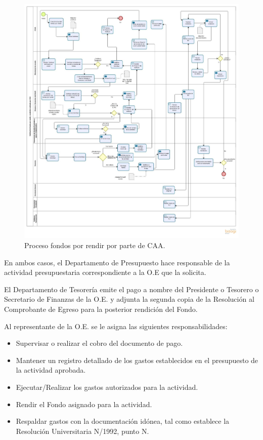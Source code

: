 \begin{figure}[h!]
	\includegraphics[width=\textwidth]{Imagenes/Solicitud_CCAA.jpg}
	\caption{\label{Solicitud_CAA}Proceso fondos por rendir por parte de CAA.}
\end{figure}

En ambos casos, el Departamento de Presupuesto hace responsable de la actividad presupuestaria correspondiente a la O.E que la solicita.

El Departamento de Tesorería emite el pago a nombre del Presidente o Tesorero o Secretario de Finanzas de la O.E. y adjunta la segunda copia de la Resolución al Comprobante de Egreso para la posterior rendición del Fondo.

Al representante de la O.E. se le asigna las siguientes responsabilidades:

\begin{itemize}
	\item Supervisar o realizar el cobro del documento de pago.
	\item Mantener un registro detallado de los gastos establecidos en el presupuesto de la actividad aprobada.
	\item Ejecutar/Realizar los gastos autorizados para la actividad.
	\item Rendir el Fondo asignado para la actividad.
	\item Respaldar gastos con la documentación idónea, tal como establece la Resolución Universitaria N/1992, punto N. 
\end{itemize} 

